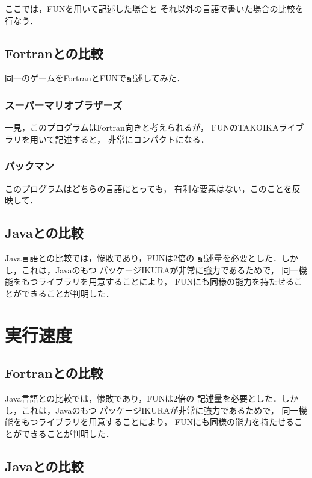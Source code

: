 \documentclass{funthesis}
\begin{document}
ここでは，FUNを用いて記述した場合と
それ以外の言語で書いた場合の比較を行なう．

\subsection{Fortranとの比較}

同一のゲームをFortranとFUNで記述してみた．

\subsubsection{スーパーマリオブラザーズ}

一見，このプログラムはFortran向きと考えられるが，
FUNのTAKOIKAライブラリを用いて記述すると，
非常にコンパクトになる．

\subsubsection{パックマン}

このプログラムはどちらの言語にとっても，
有利な要素はない，このことを反映して．

\subsection{Javaとの比較}

Java言語との比較では，惨敗であり，FUNは2倍の
記述量を必要とした．しかし，これは，Javaのもつ
パッケージIKURAが非常に強力であるためで，
同一機能をもつライブラリを用意することにより，
FUNにも同様の能力を持たせることができることが判明した．

\section{実行速度}

\subsection{Fortranとの比較}

Java言語との比較では，惨敗であり，FUNは2倍の
記述量を必要とした．しかし，これは，Javaのもつ
パッケージIKURAが非常に強力であるためで，
同一機能をもつライブラリを用意することにより，
FUNにも同様の能力を持たせることができることが判明した．

\subsection{Javaとの比較}
\end{document}
